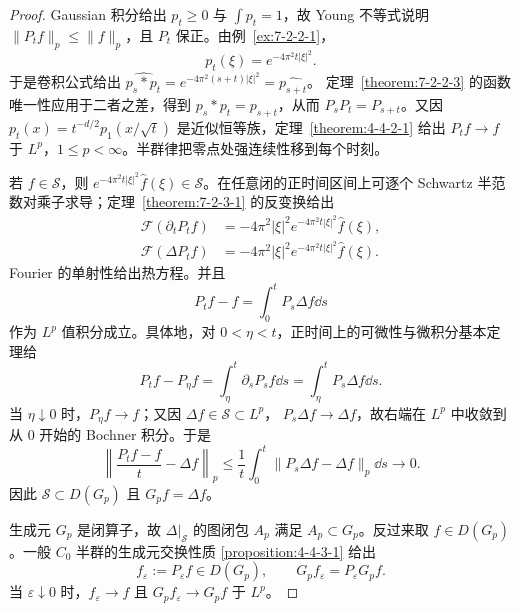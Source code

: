 \begin{proof}
Gaussian 积分给出 $p_t\geq0$ 与 $\int p_t=1$，故 Young 不等式说明
$\|P_tf\|_p\leq\|f\|_p$，且 $P_t$ 保正。由例~\ref{ex:7-2-2-1}，
\[
 \widehat{p_t}(\xi)=e^{-4\pi^2t|\xi|^2}.
\]
于是卷积公式给出
$\widehat{p_s*p_t}=e^{-4\pi^2(s+t)|\xi|^2}=\widehat{p_{s+t}}$。
定理~\ref{theorem:7-2-2-3} 的函数唯一性应用于二者之差，得到
$p_s*p_t=p_{s+t}$，从而 $P_sP_t=P_{s+t}$。又因
$p_t(x)=t^{-d/2}p_1(x/\sqrt t)$ 是近似恒等族，定理~\ref{theorem:4-4-2-1} 给出
$P_tf\to f$ 于 $L^p$，$1\leq p<\infty$。半群律把零点处强连续性移到每个时刻。

若 $f\in\mathcal S$，则
$e^{-4\pi^2t|\xi|^2}\widehat f(\xi)\in\mathcal S$。在任意闭的正时间区间上可逐个 Schwartz
半范数对乘子求导；定理~\ref{theorem:7-2-3-1} 的反变换给出
\begin{align*}
 \mathcal F(\partial_tP_tf)
 &=-4\pi^2|\xi|^2e^{-4\pi^2t|\xi|^2}\widehat f(\xi),\\
 \mathcal F(\Delta P_tf)
 &=-4\pi^2|\xi|^2e^{-4\pi^2t|\xi|^2}\widehat f(\xi).
\end{align*}
Fourier 的单射性给出热方程。并且
\[
 P_tf-f=\int_0^tP_s\Delta f\dd s
\]
作为 $L^p$ 值积分成立。具体地，对 $0<\eta<t$，正时间上的可微性与微积分基本定理给
\[
 P_tf-P_\eta f=\int_\eta^t\partial_sP_sf\dd s
 =\int_\eta^tP_s\Delta f\dd s.
\]
当 $\eta\downarrow0$ 时，$P_\eta f\to f$；又因 $\Delta f\in\mathcal S\subset L^p$，
$P_s\Delta f\to\Delta f$，故右端在 $L^p$ 中收敛到从 $0$ 开始的 Bochner 积分。于是
\[
 \left\|\frac{P_tf-f}{t}-\Delta f\right\|_p
 \leq\frac1t\int_0^t\|P_s\Delta f-\Delta f\|_p\dd s
 \longrightarrow0.
\]
因此
$\mathcal S\subset D(G_p)$ 且 $G_pf=\Delta f$。

生成元 $G_p$ 是闭算子，故 $\Delta|_{\mathcal S}$ 的图闭包 $A_p$ 满足
$A_p\subset G_p$。反过来取 $f\in D(G_p)$。一般 $C_0$ 半群的生成元交换性质
\ref{proposition:4-4-3-1} 给出
\[
 f_\varepsilon:=P_\varepsilon f\in D(G_p),\qquad
 G_pf_\varepsilon=P_\varepsilon G_pf.
\]
当 $\varepsilon\downarrow0$ 时，$f_\varepsilon\to f$ 且
$G_pf_\varepsilon\to G_pf$ 于 $L^p$。


\end{proof}

